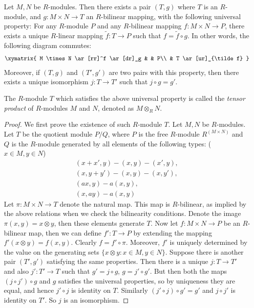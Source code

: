 \begin{lemma}
\label{lemma-tensor-product}
Let $M, N$ be $R$-modules. Then there exists a pair $(T, g)$
where $T$ is an $R$-module, and
$g : M \times N \to T$ an $R$-bilinear
mapping, with the following universal property:
For any $R$-module $P$ and any $R$-bilinear mapping
$f : M \times N \to P$, there
exists a unique $R$-linear
mapping $\tilde{f} : T \to P$ such that $f = \tilde{f} \circ g$.
In other words, the following diagram commutes:
$$
\xymatrix{
M \times N \ar[rr]^f \ar[dr]_g & & P\\
& T \ar[ur]_{\tilde f}
}
$$
Moreover, if $(T, g)$ and $(T', g')$
are two pairs with this property, then there
exists a unique isomorphism
$j : T \to T'$ such that $j\circ g = g'$.
\end{lemma}

\noindent
The $R$-module $T$ which satisfies the above universal property is called
the  {\it tensor product} of $R$-modules $M$ and $N$, denoted as
$M \otimes_R N$.

\begin{proof}
We first prove the existence of such $R$-module $T$.
Let $M, N$ be $R$-modules.
Let $T$ be the quotient module
$P/Q$, where $P$ is the free $R$-module $R^{(M \times N)}$ and $Q$ is the
$R$-module generated by all elements of
the following types: ($x\in M, y\in N$)
\begin{align*}
(x + x', y) - (x, y) - (x', y), \\
(x, y + y') - (x, y) - (x, y'), \\
(ax, y) - a(x, y), \\
(x, ay) - a(x, y)
\end{align*}
Let $\pi : M \times N \to T$ denote the natural map.
This map is $R$-bilinear, as
implied by the above relations
when we check the bilinearity conditions. Denote the image
$\pi(x, y) = x \otimes
y$, then these elements generate
$T$. Now let $f : M \times N \to P$ be an $R$-bilinear map,
then we can define
$f' : T \to P$ by extending the mapping
$f'(x \otimes y) = f(x, y)$. Clearly $f = f'\circ \pi$. Moreover, $f'$ is
uniquely determined by the value on the
generating sets $\{x \otimes y : x\in M, y\in N\}$.
Suppose there is another pair $(T', g')$ satisfying the same properties.
Then there is a unique $j : T \to T'$ and
also $j' : T' \to T$ such that $g' = j\circ g$, $g = j'\circ g'$.
But then both the maps $(j\circ j') \circ g$ and $g$
satisfies the universal properties, so by uniqueness they are equal,
and hence $j'\circ j$ is identity on $T$.
Similarly $(j'\circ j) \circ g' = g'$ and $j\circ j'$ is identity on $T'$.
So $j$ is an isomorphism.
\end{proof}